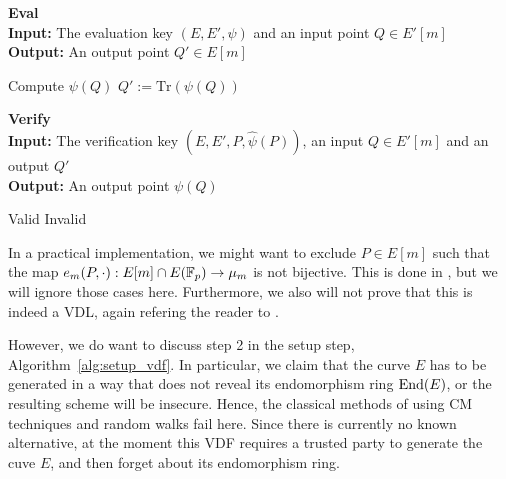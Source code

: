 \begin{algorithm}
    \caption{\label{alg:eval_vdf} \textbf{Eval}\\
    \textbf{Input:} The evaluation key $(E, E', \psi)$ and an input point $Q \in E'[m]$\\
    \textbf{Output:} An output point $Q' \in E[m]$}
    \begin{algorithmic}[1]
        \State Compute $\psi(Q)$
        \State\Return $Q' := \mathrm{Tr}(\psi(Q))$
    \end{algorithmic}
\end{algorithm}
\begin{algorithm}
    \caption{\label{alg:verify_vdf} \textbf{Verify}\\
    \textbf{Input:} The verification key $(E, E', P, \hat{\psi}(P))$, an input $Q \in E'[m]$ and an output $Q'$\\
    \textbf{Output:} An output point $\psi(Q)$}
    \begin{algorithmic}[1]
            \State\Return Valid
        \Else
            \State\Return Invalid
        \EndIf
    \end{algorithmic}
\end{algorithm}

In a practical implementation, we might want to exclude $P \in E[m]$ such that the map $e_m(P, \cdot): E[m] \cap E(\mathbb{F}_p) \to \mu_m$ is not bijective.
This is done in \cite{verifiable_delay_function}, but we will ignore those cases here.
Furthermore, we also will not prove that this is indeed a VDL, again refering the reader to \cite{verifiable_delay_function}.

However, we do want to discuss step 2 in the setup step, Algorithm~\ref{alg:setup_vdf}.
In particular, we claim that the curve $E$ has to be generated in a way that does not reveal its endomorphism ring $\mathrm{End}(E)$, or the resulting scheme will be insecure.
Hence, the classical methods of using CM techniques and random walks fail here.
Since there is currently no known alternative, at the moment this VDF requires a trusted party to generate the cuve $E$, and then forget about its endomorphism ring.

